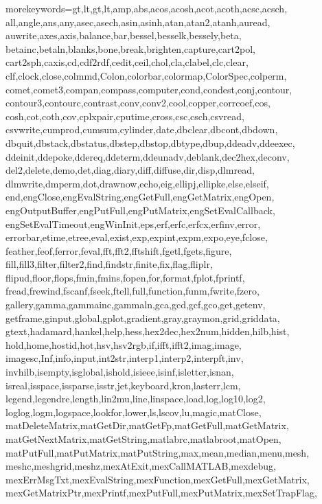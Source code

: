 %
  {morekeywords={gt,lt,gt,lt,amp,abs,acos,acosh,acot,acoth,acsc,acsch,%
      all,angle,ans,any,asec,asech,asin,asinh,atan,atan2,atanh,auread,%
      auwrite,axes,axis,balance,bar,bessel,besselk,bessely,beta,%
      betainc,betaln,blanks,bone,break,brighten,capture,cart2pol,%
      cart2sph,caxis,cd,cdf2rdf,cedit,ceil,chol,cla,clabel,clc,clear,%
      clf,clock,close,colmmd,Colon,colorbar,colormap,ColorSpec,colperm,%
      comet,comet3,compan,compass,computer,cond,condest,conj,contour,%
      contour3,contourc,contrast,conv,conv2,cool,copper,corrcoef,cos,%
      cosh,cot,coth,cov,cplxpair,cputime,cross,csc,csch,csvread,%
      csvwrite,cumprod,cumsum,cylinder,date,dbclear,dbcont,dbdown,%
      dbquit,dbstack,dbstatus,dbstep,dbstop,dbtype,dbup,ddeadv,ddeexec,%
      ddeinit,ddepoke,ddereq,ddeterm,ddeunadv,deblank,dec2hex,deconv,%
      del2,delete,demo,det,diag,diary,diff,diffuse,dir,disp,dlmread,%
      dlmwrite,dmperm,dot,drawnow,echo,eig,ellipj,ellipke,else,elseif,%
      end,engClose,engEvalString,engGetFull,engGetMatrix,engOpen,%
      engOutputBuffer,engPutFull,engPutMatrix,engSetEvalCallback,%
      engSetEvalTimeout,engWinInit,eps,erf,erfc,erfcx,erfinv,error,%
      errorbar,etime,etree,eval,exist,exp,expint,expm,expo,eye,fclose,%
      feather,feof,ferror,feval,fft,fft2,fftshift,fgetl,fgets,figure,%
      fill,fill3,filter,filter2,find,findstr,finite,fix,flag,fliplr,%
      flipud,floor,flops,fmin,fmins,fopen,for,format,fplot,fprintf,%
      fread,frewind,fscanf,fseek,ftell,full,function,funm,fwrite,fzero,%
      gallery,gamma,gammainc,gammaln,gca,gcd,gcf,gco,get,getenv,%
      getframe,ginput,global,gplot,gradient,gray,graymon,grid,griddata,%
      gtext,hadamard,hankel,help,hess,hex2dec,hex2num,hidden,hilb,hist,%
      hold,home,hostid,hot,hsv,hsv2rgb,if,ifft,ifft2,imag,image,%
      imagesc,Inf,info,input,int2str,interp1,interp2,interpft,inv,%
      invhilb,isempty,isglobal,ishold,isieee,isinf,isletter,isnan,%
      isreal,isspace,issparse,isstr,jet,keyboard,kron,lasterr,lcm,%
      legend,legendre,length,lin2mu,line,linspace,load,log,log10,log2,%
      loglog,logm,logspace,lookfor,lower,ls,lscov,lu,magic,matClose,%
      matDeleteMatrix,matGetDir,matGetFp,matGetFull,matGetMatrix,%
      matGetNextMatrix,matGetString,matlabrc,matlabroot,matOpen,%
      matPutFull,matPutMatrix,matPutString,max,mean,median,menu,mesh,%
      meshc,meshgrid,meshz,mexAtExit,mexCallMATLAB,mexdebug,%
      mexErrMsgTxt,mexEvalString,mexFunction,mexGetFull,mexGetMatrix,%
      mexGetMatrixPtr,mexPrintf,mexPutFull,mexPutMatrix,mexSetTrapFlag,%
}}

